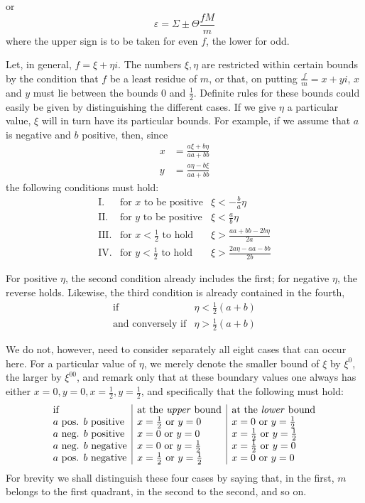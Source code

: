 or
\[
\varepsilon=\Sigma\pm\Theta\frac{fM}{m}
\]
where the upper sign is to be taken for even $f$, the lower for odd.

Let, in general, $f=\xi+\eta i$. The numbers $\xi,\eta$ are restricted within certain bounds by the condition that $f$ be a least residue of $m$, or that, on putting $\frac{f}{m}=x+yi$, $x$ and $y$ must lie between the bounds $0$ and $\frac12$. Definite rules for these bounds could easily be given by distinguishing the different cases. If we give $\eta$ a particular value, $\xi$ will in turn have its particular bounds. For example, if we assume that $a$ is negative and $b$ positive, then, since
\[
\begin{aligned}
x&=\frac{a\xi+b\eta}{aa+bb}\\
y&=\frac{a\eta-b\xi}{aa+bb}
\end{aligned}
\]
the following conditions must hold:
\[
\begin{array}{rll}
\mathrm{I.}&\text{for }x\text{ to be positive}&\xi<-\frac{b}{a}\eta\\[3pt]
\mathrm{II.}&\text{for }y\text{ to be positive}&\xi<\frac{a}{b}\eta\\[3pt]
\mathrm{III.}&\text{for }x<\frac12\text{ to hold}&\xi>\frac{aa+bb-2b\eta}{2a}\\[3pt]
\mathrm{IV.}&\text{for }y<\frac12\text{ to hold}&\xi>\frac{2a\eta-aa-bb}{2b}
\end{array}
\]

For positive $\eta$, the second condition already includes the first; for negative $\eta$, the reverse holds. Likewise, the third condition is already contained in the fourth,
\[
\begin{array}{ll}
\text{if}&\eta<\tfrac12(a+b)\\
\text{and conversely if}&\eta>\tfrac12(a+b)
\end{array}
\]

We do not, however, need to consider separately all eight cases that can occur here. For a particular value of $\eta$, we merely denote the smaller bound of $\xi$ by $\xi^0$, the larger by $\xi^{00}$, and remark only that at these boundary values one always has either $x=0,y=0,x=\frac12,y=\frac12$, and specifically that the following must hold:
\[
\begin{array}{l|l|l}
\text{if}&\text{at the \emph{upper} bound}&\text{at the \emph{lower} bound}\\
a\text{ pos. }b\text{ positive}&x=\frac12\text{ or }y=0&x=0\text{ or }y=\frac12\\
a\text{ neg. }b\text{ positive}&x=0\text{ or }y=0&x=\frac12\text{ or }y=\frac12\\
a\text{ neg. }b\text{ negative}&x=0\text{ or }y=\frac12&x=\frac12\text{ or }y=0\\
a\text{ pos. }b\text{ negative}&x=\frac12\text{ or }y=\frac12&x=0\text{ or }y=0
\end{array}
\]
For brevity we shall distinguish these four cases by saying that, in the first, $m$ belongs to the first quadrant, in the second to the second, and so on.

